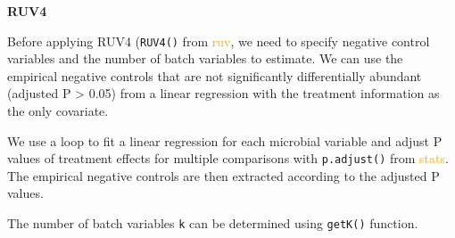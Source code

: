 \documentclass[
]{book}
\newenvironment{Shaded}{\begin{snugshade}}{\end{snugshade}}
\newcommand{\AttributeTok}[1]{\textcolor[rgb]{0.77,0.63,0.00}{#1}}
\newcommand{\CommentTok}[1]{\textcolor[rgb]{0.56,0.35,0.01}{\textit{#1}}}
\newcommand{\ControlFlowTok}[1]{\textcolor[rgb]{0.13,0.29,0.53}{\textbf{#1}}}
\newcommand{\DecValTok}[1]{\textcolor[rgb]{0.00,0.00,0.81}{#1}}
\newcommand{\FloatTok}[1]{\textcolor[rgb]{0.00,0.00,0.81}{#1}}
\newcommand{\FunctionTok}[1]{\textcolor[rgb]{0.00,0.00,0.00}{#1}}
\newcommand{\NormalTok}[1]{#1}
\newcommand{\OtherTok}[1]{\textcolor[rgb]{0.56,0.35,0.01}{#1}}
\newcommand{\SpecialCharTok}[1]{\textcolor[rgb]{0.00,0.00,0.00}{#1}}
\newcommand{\StringTok}[1]{\textcolor[rgb]{0.31,0.60,0.02}{#1}}
\begin{document}
\textbf{RUV4}

Before applying RUV4 (\texttt{RUV4()} from \textcolor{orange}{ruv}, we need to specify negative control variables and the number of batch variables to estimate. We can use the empirical negative controls that are not significantly differentially abundant (adjusted P \textgreater{} 0.05) from a linear regression with the treatment information as the only covariate.

We use a loop to fit a linear regression for each microbial variable and adjust P values of treatment effects for multiple comparisons with \texttt{p.adjust()} from \textcolor{orange}{stats}. The empirical negative controls are then extracted according to the adjusted P values.

\begin{Shaded}
\end{Shaded}

The number of batch variables \texttt{k} can be determined using \texttt{getK()} function.

\begin{Shaded}
\end{Shaded}
\end{document}
